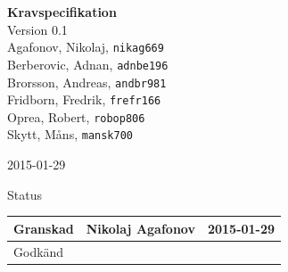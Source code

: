 \documentclass[11pt]{article}
\date{}
\begin{document}
\begin{titlepage}
\begin{center}
{\Large\bfseries Kravspecifikation}\\
%
\vspace{2\baselineskip}
%
Version 0.1\\
\vspace{2\baselineskip}
%
Agafonov, Nikolaj, 
\texttt{nikag669}
\\
Berberovic, Adnan, 
\texttt{adnbe196}
\\
Brorsson, Andreas, 
\texttt{andbr981}
\\
Fridborn, Fredrik, 
\texttt{frefr166}
\\
Oprea, Robert, 
\texttt{robop806}
\\
Skytt, Måns, 
\texttt{mansk700}

\vspace{2\baselineskip}
2015-01-29

\vspace{25\baselineskip}
Status
\begin{longtable}{|l|l|l|} \hline

Granskad &
Nikolaj Agafonov &
2015-01-29 \\ \hline
Godkänd &
 &
 \\ \hline
\end{longtable}

\end{center}
\end{titlepage}
\end{document}

